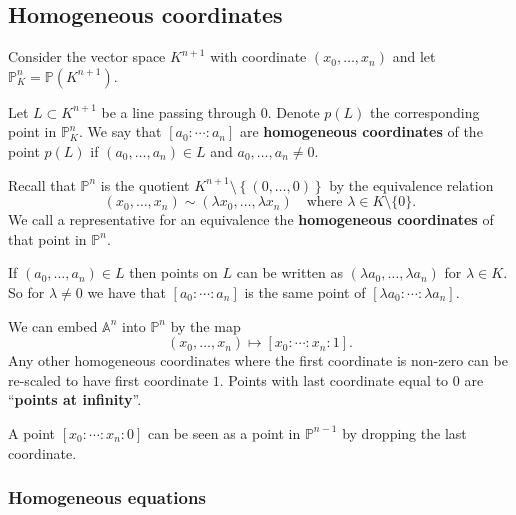 \documentclass[12pt, a4paper]{article}
\renewcommand{\AA}{\mathbb A}
\newcommand{\PP}{\mathbb P}
\begin{document}
\subsection{Homogeneous coordinates}

\begin{definition}
    Consider the vector space \(K^{n+1}\) with coordinate \((x_0,\ldots,x_n)\) and let \(\PP^n_K = \PP(K^{n+1})\). 
    
    Let \(L \subset K^{n+1}\) be a line passing through \(0\). Denote \(p(L)\) the corresponding point in \(\PP^n_K\). We say that \([a_0:\cdots:a_n]\) are \textbf{homogeneous coordinates} of the point \(p(L)\) if \((a_0,\ldots,a_n) \in L\) and \(a_0,\ldots,a_n \neq 0\).
\end{definition}

\begin{mdnote}
    Recall that \(\PP^n\) is the quotient \(K^{n+1}\setminus \left\{ (0,\ldots,0) \right\}\) by the equivalence relation 
    \[(x_0,\ldots,x_n) \sim (\lambda x_0,\ldots,\lambda x_n) \quad \text{where } \lambda \in K\setminus \{0\}.\]
    We call a representative for an equivalence the \textbf{homogeneous coordinates} of that point in \(\PP^n\).
\end{mdnote}

\begin{mdremark}
    If \((a_0,\ldots,a_n) \in L\) then points on \(L\) can be written as \((\lambda a_0,\ldots,\lambda a_n)\) for \(\lambda\in K\). So for \(\lambda\neq 0\) we have that \([a_0:\cdots:a_n]\) is the same point of \([\lambda a_0:\cdots:\lambda a_n]\).
\end{mdremark}

\begin{mdthm}
    We can embed \(\AA^n\) into \(\PP^n\) by the map 
    \[(x_0,\ldots,x_n) \mapsto [x_0:\cdots:x_n:1].\]
    Any other homogeneous coordinates where the first coordinate is non-zero can be re-scaled to have first coordinate \(1\). Points with last coordinate equal to \(0\) are ``\textbf{points at infinity}''. 
\end{mdthm}

\begin{mdremark}
    A point \([x_0:\cdots:x_n:0]\) can be seen as a point in \(\PP^{n-1}\) by dropping the last coordinate.
\end{mdremark}

\subsubsection{Homogeneous equations}
\end{document}
